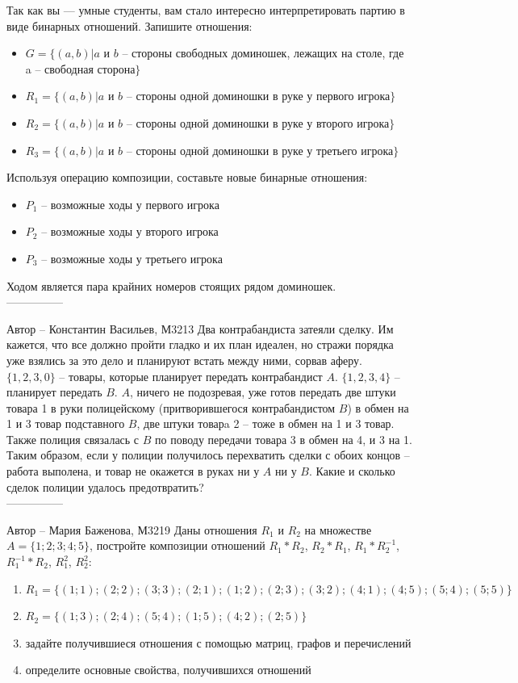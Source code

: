 \documentclass[10pt]{exam}
\begin{document}
\begin{questions}
Так как вы — умные студенты, вам стало интересно интерпретировать партию в виде бинарных отношений. Запишите отношения:
\begin{itemize}
    \item $G = \{(a,b)|a$ и $b$ – стороны свободных доминошек, лежащих на столе, где a – свободная сторона$\}$
    \item $R_1 = \{(a,b)|a$ и $b$ – стороны одной доминошки в руке у первого игрока$\}$
    \item $R_2 = \{(a,b)|a$ и $b$ – стороны одной доминошки в руке у второго игрока$\}$
    \item $R_3 = \{(a,b)|a$ и $b$ – стороны одной доминошки в руке у третьего игрока$\}$
\end{itemize}

Используя операцию композиции, составьте новые бинарные отношения:
\begin{itemize}
    \item $P_1$ – возможные ходы у первого игрока
    \item $P_2$ – возможные ходы у второго игрока
    \item $P_3$ – возможные ходы у третьего игрока
\end{itemize}


Ходом является пара крайних номеров стоящих рядом доминошек.
\\
---------------

Автор -- Константин Васильев, М3213\question
Два контрабандиста затеяли сделку. Им кажется, что все должно пройти гладко и их план идеален, но стражи порядка уже взялись за это дело и планируют встать между ними, сорвав аферу. $\{1, 2, 3, 0\}$ – товары, которые планирует передать контрабандист $A$. $\{1, 2, 3, 4\}$ – планирует передать $B$. $A$, ничего не подозревая, уже готов передать две штуки товара 1 в руки полицейскому (притворившегося контрабандистом $B$) в обмен на 1 и 3 товар подставного $B$, две штуки товарa 2 – тоже в обмен на 1 и 3 товар. Также полиция связалась с $B$ по поводу передачи товара 3 в обмен на 4, и 3 на 1. Таким образом, если у полиции получилось перехватить сделки с обоих концов – работа выполена, и товар не окажется в руках ни у $A$ ни у $B$. Какие и сколько сделок полиции удалось предотвратить?
\\
---------------

Автор -- Мария Баженова, М3219\question
Даны отношения $R_1$ и $R_2$ на множестве $A = \{1; 2; 3; 4; 5\}$, постройте композиции отношений $R_1*R_2$, $R_2*R_1$,  $R_1*R_2^{-1}$, $R_1^{-1}*R_2$, $R_1^2$, $R_2^2$:
\begin{enumerate}
	\renewcommand{\labelenumi}{\alph{enumi})}
	\item $R_1 = \{(1; 1); (2; 2); (3; 3); (2; 1); (1; 2); (2; 3); (3; 2); (4; 1); (4; 5); (5; 4); (5; 5)\}$
	\item $R_2 = \{(1; 3); (2; 4); (5; 4); (1; 5); (4; 2); (2; 5)\}$
	\item задайте получившиеся отношения с помощью матриц, графов и перечислений 
	\item определите основные свойства, получившихся отношений
\end{enumerate}


\end{questions}
\end{document}
